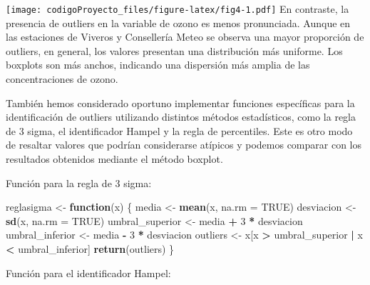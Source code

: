 \documentclass[
]{article}
\newenvironment{Shaded}{\begin{snugshade}}{\end{snugshade}}
\newcommand{\AttributeTok}[1]{\textcolor[rgb]{0.13,0.29,0.53}{#1}}
\newcommand{\ConstantTok}[1]{\textcolor[rgb]{0.56,0.35,0.01}{#1}}
\newcommand{\ControlFlowTok}[1]{\textcolor[rgb]{0.13,0.29,0.53}{\textbf{#1}}}
\newcommand{\DecValTok}[1]{\textcolor[rgb]{0.00,0.00,0.81}{#1}}
\newcommand{\FunctionTok}[1]{\textcolor[rgb]{0.13,0.29,0.53}{\textbf{#1}}}
\newcommand{\NormalTok}[1]{#1}
\newcommand{\OtherTok}[1]{\textcolor[rgb]{0.56,0.35,0.01}{#1}}
\newcommand{\SpecialCharTok}[1]{\textcolor[rgb]{0.81,0.36,0.00}{\textbf{#1}}}
\begin{document}
\texttt{[image: codigoProyecto\_files/figure-latex/fig4-1.pdf]} En
contraste, la presencia de outliers en la variable de ozono es menos
pronunciada. Aunque en las estaciones de Viveros y Consellería Meteo se
observa una mayor proporción de outliers, en general, los valores
presentan una distribución más uniforme. Los boxplots son más anchos,
indicando una dispersión más amplia de las concentraciones de ozono.

También hemos considerado oportuno implementar funciones específicas
para la identificación de outliers utilizando distintos métodos
estadísticos, como la regla de 3 sigma, el identificador Hampel y la
regla de percentiles. Este es otro modo de resaltar valores que podrían
considerarse atípicos y podemos comparar con los resultados obtenidos
mediante el método boxplot.

Función para la regla de 3 sigma:

\begin{Shaded}
\begin{Highlighting}[]
\NormalTok{reglasigma }\OtherTok{\textless{}{-}} \ControlFlowTok{function}\NormalTok{(x) \{}
\NormalTok{  media }\OtherTok{\textless{}{-}} \FunctionTok{mean}\NormalTok{(x, }\AttributeTok{na.rm =} \ConstantTok{TRUE}\NormalTok{)}
\NormalTok{  desviacion }\OtherTok{\textless{}{-}} \FunctionTok{sd}\NormalTok{(x, }\AttributeTok{na.rm =} \ConstantTok{TRUE}\NormalTok{)}
\NormalTok{  umbral\_superior }\OtherTok{\textless{}{-}}\NormalTok{ media }\SpecialCharTok{+} \DecValTok{3} \SpecialCharTok{*}\NormalTok{ desviacion}
\NormalTok{  umbral\_inferior }\OtherTok{\textless{}{-}}\NormalTok{ media }\SpecialCharTok{{-}} \DecValTok{3} \SpecialCharTok{*}\NormalTok{ desviacion}
\NormalTok{  outliers }\OtherTok{\textless{}{-}}\NormalTok{ x[x }\SpecialCharTok{\textgreater{}}\NormalTok{ umbral\_superior }\SpecialCharTok{|}\NormalTok{ x }\SpecialCharTok{\textless{}}\NormalTok{ umbral\_inferior]}
  \FunctionTok{return}\NormalTok{(outliers)}
\NormalTok{\}}
\end{Highlighting}
\end{Shaded}

Función para el identificador Hampel:
\end{document}
